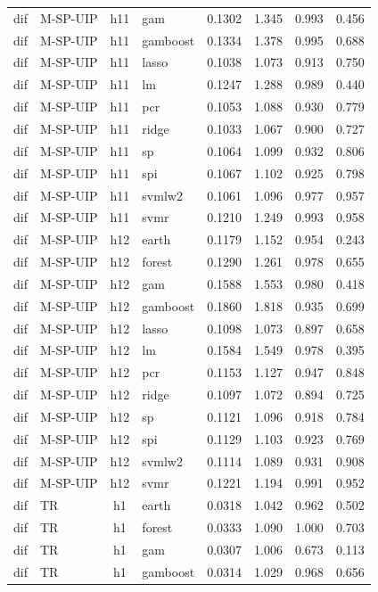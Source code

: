 \begin{ThreePartTable}
\begin{longtable}[t]{llclcccc}
dif & M-SP-UIP & h11 & gam & 0.1302 & 1.345 & 0.993 & 0.456\\
dif & M-SP-UIP & h11 & gamboost & 0.1334 & 1.378 & 0.995 & 0.688\\
dif & M-SP-UIP & h11 & lasso & 0.1038 & 1.073 & 0.913 & 0.750\\
dif & M-SP-UIP & h11 & lm & 0.1247 & 1.288 & 0.989 & 0.440\\
dif & M-SP-UIP & h11 & pcr & 0.1053 & 1.088 & 0.930 & 0.779\\
dif & M-SP-UIP & h11 & ridge & 0.1033 & 1.067 & 0.900 & 0.727\\
dif & M-SP-UIP & h11 & sp & 0.1064 & 1.099 & 0.932 & 0.806\\
dif & M-SP-UIP & h11 & spi & 0.1067 & 1.102 & 0.925 & 0.798\\
dif & M-SP-UIP & h11 & svmlw2 & 0.1061 & 1.096 & 0.977 & 0.957\\
dif & M-SP-UIP & h11 & svmr & 0.1210 & 1.249 & 0.993 & 0.958\\
\addlinespace
dif & M-SP-UIP & h12 & earth & 0.1179 & 1.152 & 0.954 & 0.243\\
dif & M-SP-UIP & h12 & forest & 0.1290 & 1.261 & 0.978 & 0.655\\
dif & M-SP-UIP & h12 & gam & 0.1588 & 1.553 & 0.980 & 0.418\\
dif & M-SP-UIP & h12 & gamboost & 0.1860 & 1.818 & 0.935 & 0.699\\
dif & M-SP-UIP & h12 & lasso & 0.1098 & 1.073 & 0.897 & 0.658\\
dif & M-SP-UIP & h12 & lm & 0.1584 & 1.549 & 0.978 & 0.395\\
dif & M-SP-UIP & h12 & pcr & 0.1153 & 1.127 & 0.947 & 0.848\\
dif & M-SP-UIP & h12 & ridge & 0.1097 & 1.072 & 0.894 & 0.725\\
dif & M-SP-UIP & h12 & sp & 0.1121 & 1.096 & 0.918 & 0.784\\
dif & M-SP-UIP & h12 & spi & 0.1129 & 1.103 & 0.923 & 0.769\\
dif & M-SP-UIP & h12 & svmlw2 & 0.1114 & 1.089 & 0.931 & 0.908\\
dif & M-SP-UIP & h12 & svmr & 0.1221 & 1.194 & 0.991 & 0.952\\
\addlinespace
dif & TR & h1 & earth & 0.0318 & 1.042 & 0.962 & 0.502\\
dif & TR & h1 & forest & 0.0333 & 1.090 & 1.000 & 0.703\\
dif & TR & h1 & gam & 0.0307 & 1.006 & 0.673 & 0.113\\
dif & TR & h1 & gamboost & 0.0314 & 1.029 & 0.968 & 0.656\\

\end{longtable}
\end{ThreePartTable}
